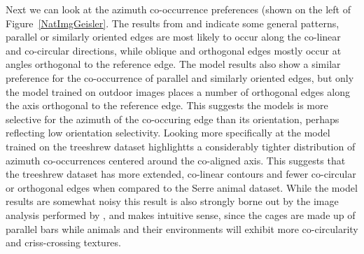 Next we can look at the azimuth co-occurrence preferences (shown on
the left of Figure~\ref{NatImgGeisler}. The results from
\cite{Geisler2001} and \cite{Perrinet2015} indicate some general
patterns, parallel or similarly oriented edges are most likely to
occur along the co-linear and co-circular directions, while oblique
and orthogonal edges mostly occur at angles orthogonal to the
reference edge. The model results also show a similar preference for
the co-occurrence of parallel and similarly oriented edges, but only
the model trained on outdoor images places a number of orthogonal
edges along the axis orthogonal to the reference edge. This suggests
the models is more selective for the azimuth of the co-occuring edge
than its orientation, perhaps reflecting low orientation selectivity.
Looking more specifically at the model trained on the treeshrew
dataset highlightts a considerably tighter distribution of azimuth
co-occurrences centered around the co-aligned axis. This suggests that
the treeshrew dataset has more extended, co-linear contours and fewer
co-circular or orthogonal edges when compared to the Serre animal
dataset. While the model results are somewhat noisy this result is
also strongly borne out by the image analysis performed by
\cite{Perrinet2015}, and makes intuitive sense, since the cages are
made up of parallel bars while animals and their environments will
exhibit more co-circularity and criss-crossing textures.


